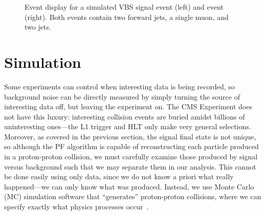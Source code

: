 \begin{figure}[htb]
    \centering
    \qquad
    \caption[Event display for a simulated VBS \WH signal and \ttbar event]{
        Event display for a simulated VBS \WH signal event (left) and \ttbar event (right). 
        Both events contain two forward jets, a single muon, and two \PQb jets. 
    }
    \label{fig:vbs_vs_ttbar}
\end{figure}

\section{Simulation}
Some experiments can control when interesting data is being recorded, so background noise can be directly measured by simply turning the source of interesting data off, but leaving the experiment on. 
The CMS Experiment does not have this luxury: interesting collision events are buried amidst billions of uninteresting ones---the L1 trigger and HLT only make very general selections. 
Moreover, as covered in the previous section, the signal final state is not unique, so although the PF algorithm is capable of reconstructing each particle produced in a proton-proton collision, we must carefully examine those produced by signal versus background such that we may separate them in our analysis. 
This cannot be done easily using only data, since we do not know a priori what really happened---we can only know what was produced. 
Instead, we use Monte Carlo (MC) simulation software that ``generates'' proton-proton collisions, where we can specify exactly what physics processes occur~\cite{Buckley:2011ms}. 

